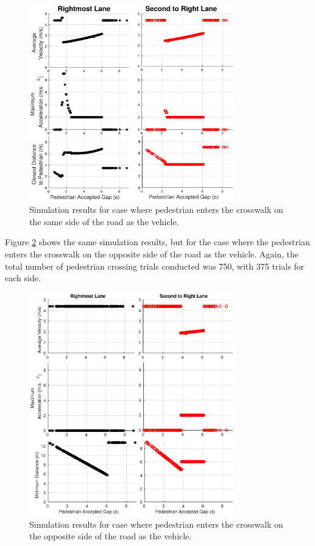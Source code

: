 \documentclass[letterpaper, 10 pt, conference]{ieeeconf}  %
\begin{document}
\begin{figure}
\centering
\includegraphics[width=3.5in]{figures/velPlot.eps}
\caption{Simulation results for case where pedestrian enters the crosswalk on the same side of the road as the vehicle.}
\label{fig:velPlot1}
\end{figure}

Figure \ref{fig:velPlot2} shows the same simulation results, but for the case where the pedestrian enters the crosswalk on the opposite side of the road as the vehicle. Again, the total number of pedestrian crossing trials conducted was 750, with 375 trials for each side.  

\begin{figure}
\centering
\includegraphics[width=3.5in]{figures/velPlot2.eps}
\caption{Simulation results for case where pedestrian enters the crosswalk on the opposite side of the road as the vehicle.}
\label{fig:velPlot2}
\end{figure}
\end{document}
